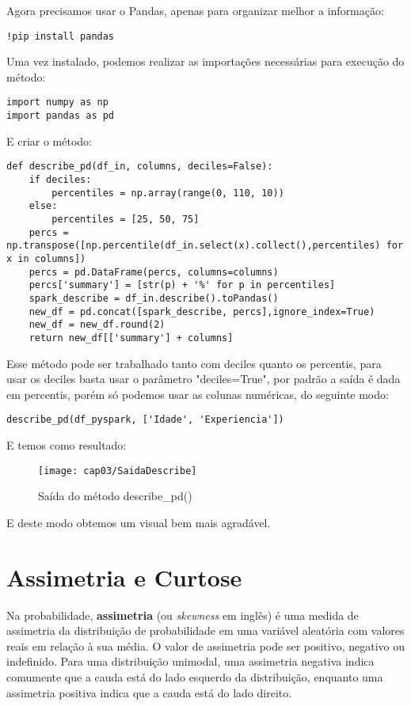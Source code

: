 Agora precisamos usar o Pandas, apenas para organizar melhor a informação:
\begin{lstlisting}[]
!pip install pandas
\end{lstlisting}

Uma vez instalado, podemos realizar as importações necessárias para execução do método:
\begin{lstlisting}[]
import numpy as np
import pandas as pd
\end{lstlisting}

E criar o método:
\begin{lstlisting}[]
def describe_pd(df_in, columns, deciles=False):
    if deciles:
        percentiles = np.array(range(0, 110, 10))
    else:
        percentiles = [25, 50, 75]
    percs = np.transpose([np.percentile(df_in.select(x).collect(),percentiles) for x in columns])
    percs = pd.DataFrame(percs, columns=columns)
    percs['summary'] = [str(p) + '%' for p in percentiles]
    spark_describe = df_in.describe().toPandas()
    new_df = pd.concat([spark_describe, percs],ignore_index=True)
    new_df = new_df.round(2)
    return new_df[['summary'] + columns]
\end{lstlisting}

Esse método pode ser trabalhado tanto com deciles quanto os percentis, para usar os deciles basta usar o parâmetro "deciles=True", por padrão a saída é dada em percentis, porém só podemos usar as colunas numéricas, do seguinte modo:
\begin{lstlisting}[]
describe_pd(df_pyspark, ['Idade', 'Experiencia'])
\end{lstlisting}

E temos como resultado:
\begin{figure}[H]
	\centering\texttt{[image: cap03/SaidaDescribe]}
	\caption{Saída do método describe\_pd()}
\end{figure}

E deste modo obtemos um visual bem mais agradável.

\section{Assimetria e Curtose}

Na probabilidade, \textbf{assimetria} (ou \textit{skewness} em inglês) é uma medida de assimetria da distribuição de probabilidade em uma variável aleatória com valores reais em relação à sua média. O valor de assimetria pode ser positivo, negativo ou indefinido. Para uma distribuição unimodal, uma assimetria negativa indica comumente que a cauda está do lado esquerdo da distribuição, enquanto uma assimetria positiva indica que a cauda está do lado direito.

